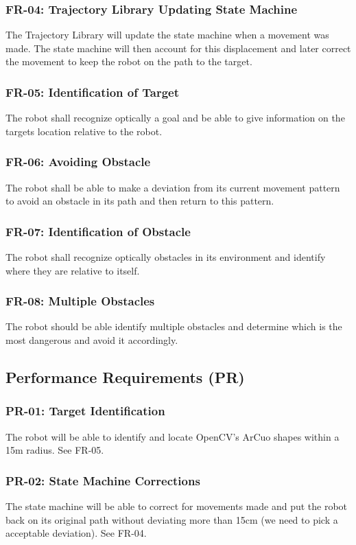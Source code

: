 \documentclass{article}
\begin{document}
		\subsubsection{FR-04: Trajectory Library Updating State Machine}
		The Trajectory Library will update the state machine when a movement was made. The state machine will then account for this displacement and later correct the movement to keep the robot on the path to the target.
		
		\subsubsection{FR-05: Identification of Target}
		The robot shall recognize optically a goal and be able to give information on the targets location relative to the robot. 
		
		\subsubsection{FR-06: Avoiding Obstacle}
		The robot shall be able to make a deviation from its current movement pattern to avoid an obstacle in its path and then return to this pattern.
		
		\subsubsection{FR-07: Identification of Obstacle}
		The robot shall recognize optically obstacles in its environment and identify where they are relative to itself.
		
		\subsubsection{FR-08: Multiple Obstacles}
		The robot should be able identify multiple obstacles and determine which is the most dangerous and avoid it accordingly. 
		
	\subsection{Performance Requirements (PR)}
	
		\subsubsection{PR-01: Target Identification}
		The robot will be able to identify and locate OpenCV's ArCuo shapes within a 15m radius. See FR-05.
		
		\subsubsection{PR-02: State Machine Corrections}
		The state machine will be able to correct for movements made and put the robot back on its original path without deviating more than 15cm (we need to pick a acceptable deviation). See FR-04.
		
\end{document}
